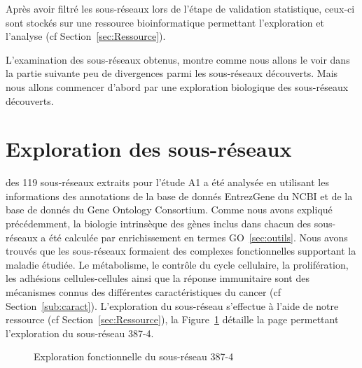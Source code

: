 		Après avoir filtré les sous-réseaux lors de l'étape de validation statistique, ceux-ci sont stockés sur une ressource bioinformatique permettant l'exploration et l'analyse (cf Section~\ref{sec:Ressource}).

\pagebreak

		L'examination des sous-réseaux obtenus, montre comme nous allons le voir dans la partie suivante peu de divergences parmi les sous-réseaux découverts.
		Mais nous allons commencer d'abord par une exploration biologique des sous-réseaux découverts.

	\section{\textcolor{green!45!black}{Exploration des sous-réseaux}}\label{sec:Exploration}
		 des 119 sous-réseaux extraits pour l'étude A1 a été analysée en utilisant les informations des annotations de la base de donnés EntrezGene du NCBI et de la base de donnés du Gene Ontology Consortium.
		Comme nous avons expliqué précédemment, la biologie intrinsèque des gènes inclus dans chacun des sous-réseaux a été calculée par enrichissement en termes \acs{GO}~\ref{sec:outils}.
		Nous avons trouvés que les sous-réseaux formaient des complexes fonctionnelles supportant la maladie étudiée.
		Le métabolisme, le contrôle du cycle cellulaire, la prolifération, les adhésions cellules-cellules ainsi que la réponse immunitaire sont des mécanismes connus des différentes caractéristiques du cancer (cf Section~\ref{sub:caract}).
		L'exploration du sous-réseau s'effectue à l'aide de notre ressource (cf Section~\ref{sec:Ressource}), la Figure~\ref{fig:Network} détaille la page permettant l'exploration du sous-réseau 387-4.

		\begin{figure}
			\begin{center}
				\def\svgwidth{\columnwidth}
				\caption{Exploration fonctionnelle du sous-réseau 387-4}
				\label{fig:Network}
			\end{center}
		\end{figure}

